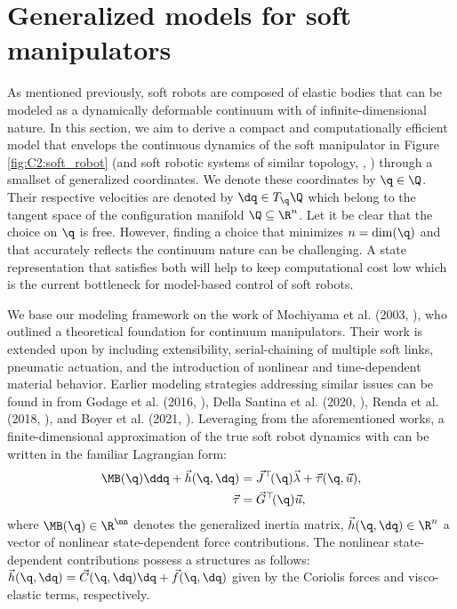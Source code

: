 \section{Generalized models for soft manipulators}
\label{sec: chap2 section header}
As mentioned previously, soft robots are composed of elastic bodies that can be \editl modeled as a dynamically deformable continuum with of infinite-dimensional nature\editr. In this section, we aim to derive a compact and computationally efficient model that envelops the continuous dynamics of \editl the soft manipulator in Figure \ref{fig:C2:soft_robot} (and soft robotic systems of similar topology, \eg, \cite{Katzschmann2018,Falkenhahn2015,BibEntryOrm2019Sep}) through a \editl small\editr set of generalized coordinates. We denote these coordinates by $\q\in\Q$. Their respective velocities are denoted by $\dq\in T_{\q}\Q$ which belong to the tangent space of the configuration manifold $\Q \subseteq \R^n$\editr. \editl Let it be clear that the choice on $\q$ is free. However, finding a choice that minimizes $n = \dim(\q)$ and that accurately reflects the continuum nature can be challenging. A state representation that satisfies both will help to keep computational cost low which is the current bottleneck for model-based control of soft robots.\editr 

We base our modeling framework on the work of Mochiyama et al. (2003, \cite{Mochiyama2003}), who outlined a theoretical foundation for continuum manipulators. Their work is extended upon by including extensibility, serial-chaining of multiple soft links, pneumatic actuation, and the introduction of nonlinear and time-dependent material behavior. Earlier modeling strategies addressing similar issues can be found in from Godage et al. (2016, \cite{Godage2015,Godage2016}), Della Santina et al. (2020, \cite{DellaSantina2020,DellaSantina2020a,DellaSantina2021}), Renda et al.
(2018, \cite{Renda2018}), and Boyer et al. (2021, \cite{Boyer2021}). Leveraging from the aforementioned works, a \editl finite-dimensional approximation of the true soft robot dynamics with \editr can be written in the familiar Lagrangian form:
%
\begin{align}
\MB(\q) \ddq + \vec{h}(\q,\dq) & = \vec{J}^\top\!(\q) \vec{\lambda} + \vec{\tau}(\q,\vec{u}), \label{eq:C2:model0}\\
\vec{\tau} & = \vec{G}^\top\!(\q) \vec{u},
\label{eq:C2:input_model0}
\end{align}
%
where $\MB(\q) \in \R^\nn$ denotes the generalized inertia matrix, $\vec{h}(\q,\dq) \in \R^n$ a vector of nonlinear state-dependent force contributions. The nonlinear state-dependent contributions possess a structures as follows: $\vec{h}(\q,\dq) = \vec{C}(\q,\dq)\dq + \vec{f}(\q,\dq)$ \editl given by the Coriolis forces and visco-elastic terms, respectively.\editr

